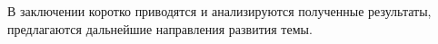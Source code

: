 %
В заключении коротко приводятся и анализируются полученные результаты, предлагаются дальнейшие направления развития темы.